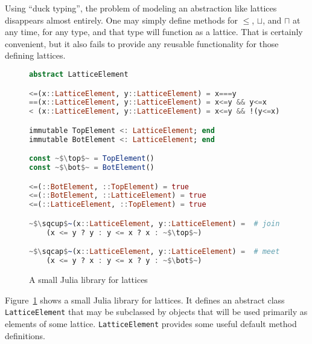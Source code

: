 Using ``duck typing'', the problem of modeling an abstraction like lattices
disappears almost entirely.
One may simply define methods for $\leq$, $\sqcup$, and $\sqcap$ at any time,
for any type, and that type will function as a lattice.
That is certainly convenient, but it also fails to provide any reusable
functionality for those defining lattices.

\begin{figure}[!t]
  \begin{center}
\begin{singlespace}
\begin{lstlisting}[language=julia]
abstract LatticeElement

<=(x::LatticeElement, y::LatticeElement) = x===y
==(x::LatticeElement, y::LatticeElement) = x<=y && y<=x
< (x::LatticeElement, y::LatticeElement) = x<=y && !(y<=x)

immutable TopElement <: LatticeElement; end
immutable BotElement <: LatticeElement; end

const ~$\top$~ = TopElement()
const ~$\bot$~ = BotElement()

<=(::BotElement, ::TopElement) = true
<=(::BotElement, ::LatticeElement) = true
<=(::LatticeElement, ::TopElement) = true

~$\sqcup$~(x::LatticeElement, y::LatticeElement) =  # join
    (x <= y ? y : y <= x ? x : ~$\top$~)

~$\sqcap$~(x::LatticeElement, y::LatticeElement) =  # meet
    (x <= y ? x : y <= x ? y : ~$\bot$~)
\end{lstlisting}
\end{singlespace}
  \end{center}
  \label{julialattices}
  \caption{A small Julia library for lattices}
\end{figure}

Figure~\ref{julialattices} shows a small Julia library for lattices.
It defines an abstract class \texttt{LatticeElement} that may be subclassed
by objects that will be used primarily as elements of some lattice.
\texttt{LatticeElement} provides some useful default method definitions.

\fi
